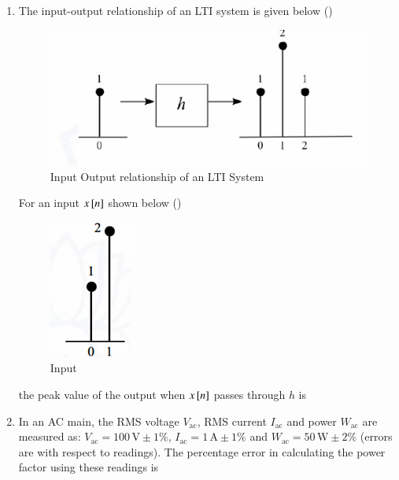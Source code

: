 \documentclass[journal,12pt,onecolumn]{IEEEtran}
\theoremstyle{remark}
\begin{document}
\begin{enumerate}
\item The input-output relationship of an LTI system is given below ()
\begin{figure}[H]
    \centering
    \includegraphics[width=0.5\linewidth]{Figs/Q-4(fig-1).png}
    \caption{Input Output relationship of an LTI System}
    \label{4(1)}
\end{figure}
For an input $x{}\left[n\right]$ shown below ()
\begin{figure}[H]
    \centering
    \includegraphics[width=0.1\linewidth]{Figs/Q-4(fig-2).png}
    \caption{Input}
    \label{4(2)}
\end{figure}
the peak value of the output when $x{}\left[n\right]$ passes through $h$ is \par \hfill{}
\begin{enumerate}
\end{enumerate}

\item In an AC main, the RMS voltage $V_{\mathrm{ac}}$, RMS current $I_{\mathrm{ac}}$ and power $W_{\mathrm{ac}}$ are measured as: $V_{\mathrm{ac}} = 100\,\mathrm{V} \pm 1\%$, $I_{\mathrm{ac}} = 1\,\mathrm{A} \pm 1\%$ and $W_{\mathrm{ac}} = 50\,\mathrm{W} \pm 2\%$ (errors are with respect to readings). The percentage error in calculating the power factor using these readings is \par \hfill{}
\begin{enumerate}
\end{enumerate}


\end{enumerate}
\end{document}
